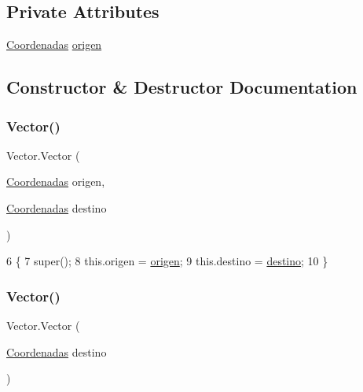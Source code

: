 \subsection*{Private Attributes}
\begin{DoxyCompactItemize}
\item 
\mbox{\hyperlink{class_coordenadas}{Coordenadas}} \mbox{\hyperlink{class_vector_a3c83b7dd875429ec0bb3a799d928bc47}{origen}}
\end{DoxyCompactItemize}


\subsection{Constructor \& Destructor Documentation}
\mbox{\label{class_vector_aff16a046f1232ec3c1e00f6b01e2e48c}} 
\subsubsection{\texorpdfstring{Vector()}{Vector()}\hspace{0.1cm}{\footnotesize\ttfamily [1/2]}}
{\footnotesize\ttfamily Vector.\+Vector (\begin{DoxyParamCaption}\item[{\mbox{\hyperlink{class_coordenadas}{Coordenadas}}}]{origen,  }\item[{\mbox{\hyperlink{class_coordenadas}{Coordenadas}}}]{destino }\end{DoxyParamCaption})\hspace{0.3cm}{\ttfamily [inline]}}


\begin{DoxyCode}
6                                                            \{
7         super();
8         this.origen = \mbox{\hyperlink{class_vector_a3c83b7dd875429ec0bb3a799d928bc47}{origen}};
9         this.destino = \mbox{\hyperlink{class_vector_af0a20e915c3efce53463578d8e73948e}{destino}};
10     \}
\end{DoxyCode}
\mbox{\label{class_vector_ae4d8991b3f3cac54955a6fc0dcad9550}} 
\subsubsection{\texorpdfstring{Vector()}{Vector()}\hspace{0.1cm}{\footnotesize\ttfamily [2/2]}}
{\footnotesize\ttfamily Vector.\+Vector (\begin{DoxyParamCaption}\item[{\mbox{\hyperlink{class_coordenadas}{Coordenadas}}}]{destino }\end{DoxyParamCaption})\hspace{0.3cm}{\ttfamily [inline]}}


